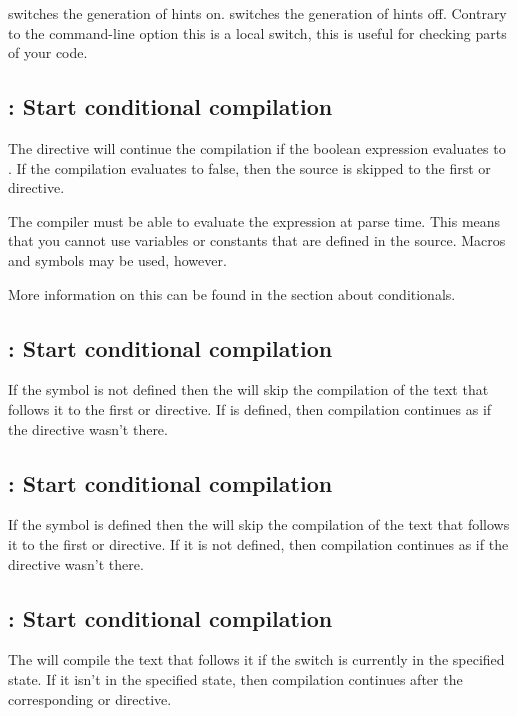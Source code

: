  switches the generation of hints on.
 switches the generation of hints off.
Contrary to the command-line option  this is a local switch,
this is useful for checking parts of your code.

\subsection{ : Start conditional compilation}

The directive  will continue the compilation
if the boolean expression  evaluates to . If the
compilation evaluates to false, then the source is skipped to the first
 or  directive.

The compiler must be able to evaluate the expression at parse time.
This means that you cannot use variables or constants that are defined in
the source. Macros and symbols may be used, however.

More information on this can be found in the section about
conditionals.

\subsection{ : Start conditional compilation}

If the symbol  is not defined then the 
will skip the compilation of the text that follows it to the first
 or  directive.
If  is defined, then compilation continues as if the directive
wasn't there.

\subsection{ : Start conditional compilation}

If the symbol  is defined then the 
will skip the compilation of the text that follows it to the first
 or  directive.
If it is not defined, then compilation continues as if the directive
wasn't there.

\subsection{ : Start conditional compilation}

The  will compile the text that follows it if the
switch  is currently in the specified state.
If it isn't in the specified state, then compilation continues after the
corresponding  or  directive.

